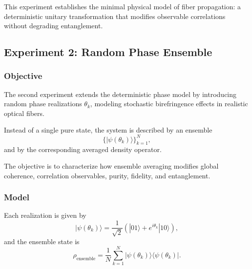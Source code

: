 \documentclass[a4paper]{article}
\begin{document}
This experiment establishes the minimal physical model of fiber propagation: a deterministic unitary transformation that modifies observable correlations without degrading entanglement.



\newpage

\subsection{Experiment 2: Random Phase Ensemble}


\subsubsection{Objective}

The second experiment extends the deterministic phase model by introducing random phase realizations \( \theta_k \), modeling stochastic birefringence effects in realistic optical fibers.

Instead of a single pure state, the system is described by an ensemble
\[
\{ |\psi(\theta_k)\rangle \}_{k=1}^{N},
\]
and by the corresponding averaged density operator.

The objective is to characterize how ensemble averaging modifies global coherence, correlation observables, purity, fidelity, and entanglement.


\subsubsection{Model}

Each realization is given by
\[
|\psi(\theta_k)\rangle
=
\frac{1}{\sqrt{2}}
\left(
|01\rangle + e^{i\theta_k}|10\rangle
\right),
\]
and the ensemble state is
\[
\rho_{\mathrm{ensemble}}
=
\frac{1}{N}
\sum_{k=1}^{N}
|\psi(\theta_k)\rangle\langle \psi(\theta_k)|.
\]

\end{document}
